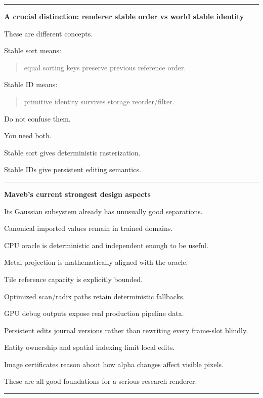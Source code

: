 \begin{center}\rule{0.5\linewidth}{0.5pt}\end{center}

\textbf{A crucial distinction: renderer stable order vs world stable identity}

These are different concepts.

Stable sort means:

\begin{quote}
equal sorting keys preserve previous reference order.
\end{quote}

Stable ID means:

\begin{quote}
primitive identity survives storage reorder/filter.
\end{quote}

Do not confuse them.

You need both.

Stable sort gives deterministic rasterization.

Stable IDs give persistent editing semantics.

\begin{center}\rule{0.5\linewidth}{0.5pt}\end{center}

\textbf{Maveb's current strongest design aspects}

Its Gaussian subsystem already has unusually good separations.

Canonical imported values remain in trained domains.

CPU oracle is deterministic and independent enough to be useful.

Metal projection is mathematically aligned with the oracle.

Tile reference capacity is explicitly bounded.

Optimized scan/radix paths retain deterministic fallbacks.

GPU debug outputs expose real production pipeline data.

Persistent edits journal versions rather than rewriting every frame-slot blindly.

Entity ownership and spatial indexing limit local edits.

Image certificates reason about how alpha changes affect visible pixels.

These are all good foundations for a serious research renderer.

\begin{center}\rule{0.5\linewidth}{0.5pt}\end{center}

